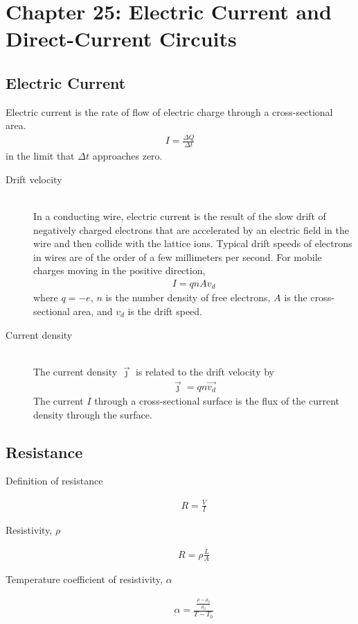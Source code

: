 \documentclass[../main.tex]{subfiles}
\begin{document}
\section{Chapter 25: Electric Current and Direct-Current Circuits}
\label{sec:chapter_25_electric_current_and_direct_current_circuits}

\subsection{Electric Current}
\label{sub:electric_current}

Electric current is the rate of flow of electric charge through a
cross-sectional area.
\begin{align}
  I = \frac{\Delta Q}{\Delta t}
\end{align}
in the limit that $\Delta t$ approaches zero.

\begin{description}
  \item[Drift velocity] \hfill \\
    In a conducting wire, electric current is the result of the slow drift of
    negatively charged electrons that are accelerated by an electric field in
    the wire and then collide with the lattice ions. Typical drift speeds of
    electrons in wires are of the order of a few millimeters per second. For
    mobile charges moving in the positive direction,
    \begin{align}
       I = qnAv_d
    \end{align}
    where $q = -e$, $n$ is the number density of free electrons, $A$ is the
    cross-sectional area, and $v_d$ is the drift speed.
  \item[Current density] \hfill \\
    The current density $\vec{\jmath}$ is related to the drift velocity by
    \begin{align}
      \vec{\jmath} = qn\vec{v_d}
    \end{align}
    The current $I$ through a cross-sectional surface is the flux of the
    current density through the surface.
\end{description}

\subsection{Resistance}
\label{sub:resistance}

\begin{description}
  \item[Definition of resistance]
    \begin{align}
      R= \frac{V}{I}
    \end{align}
  \item[Resistivity, $\rho$]
    \begin{align}
      R = \rho\frac{L}{A}
    \end{align}
  \item[Temperature coefficient of resistivity, $\alpha$]
    \begin{align}
      \alpha = \frac{\frac{\rho - \rho_0}{\rho_0}}{T-T_0}
    \end{align}
\end{description}
\end{document}
